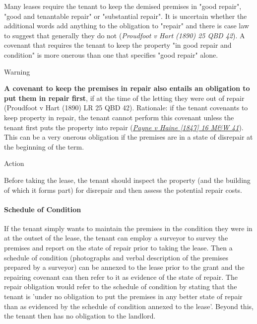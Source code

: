 \documentclass[
]{article}
\newenvironment{env-da05fb3b-c564-4905-b729-fa3c9eadbf7c}
{
    \savenotes\tcolorbox[blanker,breakable,left=5pt,borderline west={2pt}{-4pt}{aquamarine}]
}
{
    \endtcolorbox\spewnotes
}
\newenvironment{env-1183acc6-7dc8-44d4-a985-6dec306e67fd}
{
    \savenotes\tcolorbox[blanker,breakable,left=5pt,borderline west={2pt}{-4pt}{orange}]
}
{
    \endtcolorbox\spewnotes
}
\begin{document}
Many leases require the tenant to keep the demised premises in "good
repair", "good and tenantable repair" or "substantial repair". It is
uncertain whether the additional words add anything to the obligation to
"repair" and there is case law to suggest that generally they do not
(\emph{Proudfoot v Hart (1890) 25 QBD 42}). A covenant that requires the
tenant to keep the property "in good repair and condition" is more
onerous than one that specifies "good repair" alone.

\begin{env-1183acc6-7dc8-44d4-a985-6dec306e67fd}

Warning

\textbf{A covenant to keep the premises in repair also entails an
obligation to put them in repair first}, if at the time of the letting
they were out of repair (Proudfoot v Hart (1890) LR 25 QBD 42).
Rationale: if the tenant covenants to keep property in repair, the
tenant cannot perform this covenant unless the tenant first puts the
property into repair
(\emph{\href{https://uk.practicallaw.thomsonreuters.com/D-009-7105?originationContext=document\&transitionType=PLDocumentLink\&contextData=(sc.Default)\&ppcid=47d8e69b58514ba1976c981efd5911b3}{Payne
v Haine {[}1847{]} 16 M\&W 41}}). This can be a very onerous obligation
if the premises are in a state of disrepair at the beginning of the
term.

\end{env-1183acc6-7dc8-44d4-a985-6dec306e67fd}

\begin{env-da05fb3b-c564-4905-b729-fa3c9eadbf7c}

Action

Before taking the lease, the tenant should inspect the property (and the
building of which it forms part) for disrepair and then assess the
potential repair costs.

\end{env-da05fb3b-c564-4905-b729-fa3c9eadbf7c}

\hypertarget{schedule-of-condition}{%
\paragraph{Schedule of Condition}\label{schedule-of-condition}}

If the tenant simply wants to maintain the premises in the condition
they were in at the outset of the lease, the tenant can employ a
surveyor to survey the premises and report on the state of repair prior
to taking the lease. Then a schedule of condition (photographs and
verbal description of the premises prepared by a surveyor) can be
annexed to the lease prior to the grant and the repairing covenant can
then refer to it as evidence of the state of repair. The repair
obligation would refer to the schedule of condition by stating that the
tenant is 'under no obligation to put the premises in any better state
of repair than as evidenced by the schedule of condition annexed to the
lease'. Beyond this, the tenant then has no obligation to the landlord.
\end{document}
